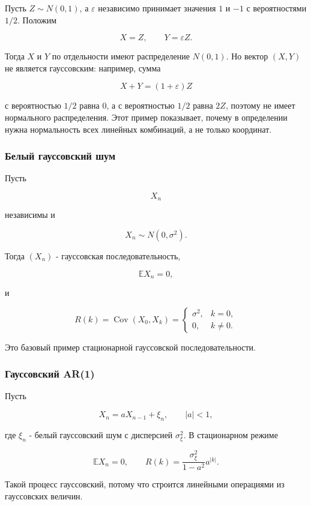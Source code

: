 \documentclass[
  11pt,
  a4paper,
]{article}
\begin{document}
Пусть \(Z\sim N(0,1)\), а \(\varepsilon\) независимо принимает значения
\(1\) и \(-1\) с вероятностями \(1/2\). Положим

\[
X=Z,
\qquad
Y=\varepsilon Z.
\]

Тогда \(X\) и \(Y\) по отдельности имеют распределение \(N(0,1)\). Но
вектор \((X,Y)\) не является гауссовским: например, сумма

\[
X+Y=(1+\varepsilon)Z
\]

с вероятностью \(1/2\) равна \(0\), а с вероятностью \(1/2\) равна
\(2Z\), поэтому не имеет нормального распределения. Этот пример
показывает, почему в определении нужна нормальность всех линейных
комбинаций, а не только координат.

\subsubsection{Белый гауссовский
шум}\label{ux431ux435ux43bux44bux439-ux433ux430ux443ux441ux441ux43eux432ux441ux43aux438ux439-ux448ux443ux43c-1}

Пусть

\[
X_n
\]

независимы и

\[
X_n\sim N(0,\sigma^2).
\]

Тогда \((X_n)\) - гауссовская последовательность,

\[
\mathbb EX_n=0,
\]

и

\[
R(k)=\operatorname{Cov}(X_0,X_k)
=
\begin{cases}
\sigma^2, & k=0,\\
0, & k\ne0.
\end{cases}
\]

Это базовый пример стационарной гауссовской последовательности.

\subsubsection{Гауссовский
AR(1)}\label{ux433ux430ux443ux441ux441ux43eux432ux441ux43aux438ux439-ar1}

Пусть

\[
X_n=aX_{n-1}+\xi_n,
\qquad |a|<1,
\]

где \(\xi_n\) - белый гауссовский шум с дисперсией \(\sigma_\xi^2\). В
стационарном режиме

\[
\mathbb EX_n=0,
\qquad
R(k)=\frac{\sigma_\xi^2}{1-a^2}a^{|k|}.
\]

Такой процесс гауссовский, потому что строится линейными операциями из
гауссовских величин.
\end{document}
